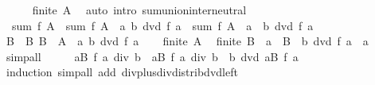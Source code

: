 \begin{isabellebody}
\ \ \ \ \isamarkupfalse%
\ {\isacartoucheopen}finite\ A{\isacartoucheclose}\ \isamarkupfalse%
\ {\isacharparenleft}{\kern0pt}auto\ intro{\isacharcolon}{\kern0pt}\ sum{\isachardot}{\kern0pt}union{\isacharunderscore}{\kern0pt}inter{\isacharunderscore}{\kern0pt}neutral{\isacharparenright}{\kern0pt}\isanewline
\ \ \isamarkupfalse%
\ \isamarkupfalse%
\ {\isacharasterisk}{\kern0pt}{\isacharcolon}{\kern0pt}\ {\isacartoucheopen}sum\ f\ A\ {\isacharequal}{\kern0pt}\ sum\ f\ {\isacharparenleft}{\kern0pt}A\ {\isasyminter}\ {\isacharbraceleft}{\kern0pt}a{\isachardot}{\kern0pt}\ b\ dvd\ f\ a{\isacharbraceright}{\kern0pt}{\isacharparenright}{\kern0pt}\ {\isacharplus}{\kern0pt}\ sum\ f\ {\isacharparenleft}{\kern0pt}A\ {\isasyminter}\ {\isacharbraceleft}{\kern0pt}a{\isachardot}{\kern0pt}\ {\isasymnot}\ b\ dvd\ f\ a{\isacharbraceright}{\kern0pt}{\isacharparenright}{\kern0pt}{\isacartoucheclose}\ \isacommand{{\isachardot}{\kern0pt}}\isamarkupfalse%
\isanewline
\ \ \isamarkupfalse%
\ B\ \ B{\isacharcolon}{\kern0pt}\ {\isacartoucheopen}B\ {\isacharequal}{\kern0pt}\ A\ {\isasyminter}\ {\isacharbraceleft}{\kern0pt}a{\isachardot}{\kern0pt}\ b\ dvd\ f\ a{\isacharbraceright}{\kern0pt}{\isacartoucheclose}\isanewline
\ \ \isamarkupfalse%
\ {\isacartoucheopen}finite\ A{\isacartoucheclose}\ \isamarkupfalse%
\ {\isacartoucheopen}finite\ B{\isacartoucheclose}\ \ {\isacartoucheopen}a\ {\isasymin}\ B\ {\isasymLongrightarrow}\ b\ dvd\ f\ a{\isacartoucheclose}\ \ a\isanewline
\ \ \ \ \isamarkupfalse%
\ simp{\isacharunderscore}{\kern0pt}all\isanewline
\ \ \isamarkupfalse%
\ \isamarkupfalse%
\ {\isacartoucheopen}{\isacharparenleft}{\kern0pt}{\isasymSum}a{\isasymin}B{\isachardot}{\kern0pt}\ f\ a{\isacharparenright}{\kern0pt}\ div\ b\ {\isacharequal}{\kern0pt}\ {\isacharparenleft}{\kern0pt}{\isasymSum}a{\isasymin}B{\isachardot}{\kern0pt}\ f\ a\ div\ b{\isacharparenright}{\kern0pt}{\isacartoucheclose}\ \ {\isacartoucheopen}b\ dvd\ {\isacharparenleft}{\kern0pt}{\isasymSum}a{\isasymin}B{\isachardot}{\kern0pt}\ f\ a{\isacharparenright}{\kern0pt}{\isacartoucheclose}\isanewline
\ \ \ \ \isamarkupfalse%
\ induction\ {\isacharparenleft}{\kern0pt}simp{\isacharunderscore}{\kern0pt}all\ add{\isacharcolon}{\kern0pt}\ div{\isacharunderscore}{\kern0pt}plus{\isacharunderscore}{\kern0pt}div{\isacharunderscore}{\kern0pt}distrib{\isacharunderscore}{\kern0pt}dvd{\isacharunderscore}{\kern0pt}left{\isacharparenright}{\kern0pt}\isanewline

\end{isabellebody}
